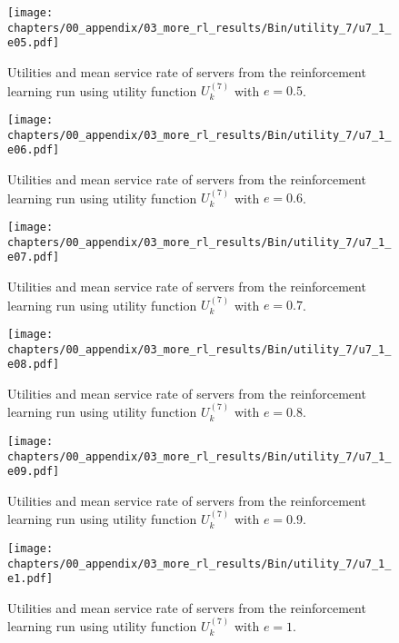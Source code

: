 \begin{figure}[H]
    \texttt{[image: chapters/00\_appendix/03\_more\_rl\_results/Bin/utility\_7/u7\_1\_e05.pdf]}
    \caption{Utilities and mean service rate of servers from the reinforcement
    learning run using utility function \(U_k^{(7)}\) with \(e = 0.5\).}
    \label{fig:RL_utility7_1_e05}
\end{figure}

\begin{figure}[H]
    \texttt{[image: chapters/00\_appendix/03\_more\_rl\_results/Bin/utility\_7/u7\_1\_e06.pdf]}
    \caption{Utilities and mean service rate of servers from the reinforcement
    learning run using utility function \(U_k^{(7)}\) with \(e = 0.6\).}
    \label{fig:RL_utility7_1_e06}
\end{figure}

\begin{figure}[H]
    \texttt{[image: chapters/00\_appendix/03\_more\_rl\_results/Bin/utility\_7/u7\_1\_e07.pdf]}
    \caption{Utilities and mean service rate of servers from the reinforcement
    learning run using utility function \(U_k^{(7)}\) with \(e = 0.7\).}
    \label{fig:RL_utility7_1_e07}
\end{figure}

\begin{figure}[H]
    \texttt{[image: chapters/00\_appendix/03\_more\_rl\_results/Bin/utility\_7/u7\_1\_e08.pdf]}
    \caption{Utilities and mean service rate of servers from the reinforcement
    learning run using utility function \(U_k^{(7)}\) with \(e = 0.8\).}
    \label{fig:RL_utility7_1_e08}
\end{figure}

\begin{figure}[H]
    \texttt{[image: chapters/00\_appendix/03\_more\_rl\_results/Bin/utility\_7/u7\_1\_e09.pdf]}
    \caption{Utilities and mean service rate of servers from the reinforcement
    learning run using utility function \(U_k^{(7)}\) with \(e = 0.9\).}
    \label{fig:RL_utility7_1_e09}
\end{figure}

\begin{figure}[H]
    \texttt{[image: chapters/00\_appendix/03\_more\_rl\_results/Bin/utility\_7/u7\_1\_e1.pdf]}
    \caption{Utilities and mean service rate of servers from the reinforcement
    learning run using utility function \(U_k^{(7)}\) with \(e = 1\).}
    \label{fig:RL_utility7_1_e1}
\end{figure}

